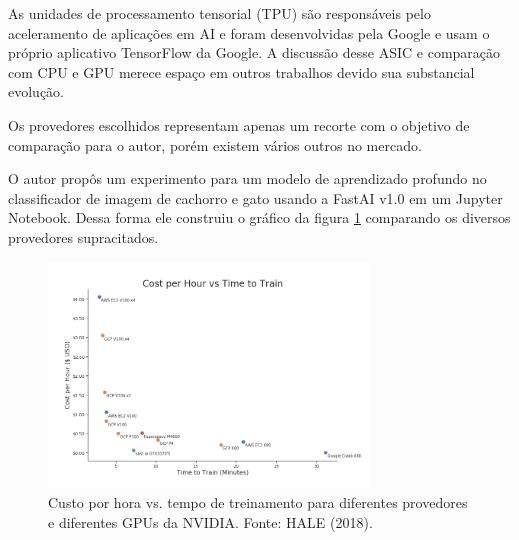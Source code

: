 \documentclass[letterpaper, 10 pt, conference]{ieeeconf}  %
\begin{document}
As unidades de processamento tensorial (TPU) são responsáveis pelo aceleramento de aplicações em AI e foram desenvolvidas pela Google e usam o próprio aplicativo TensorFlow da Google. A discussão desse ASIC e comparação com CPU e GPU merece espaço em outros trabalhos devido sua substancial evolução.

Os provedores escolhidos representam apenas um recorte com o objetivo de comparação para o autor, porém existem vários outros no mercado.

O autor propôs um experimento para um modelo de aprendizado profundo no classificador de imagem de cachorro e gato usando a FastAI v1.0 em um Jupyter Notebook. Dessa forma ele construiu o gráfico da figura \ref{medium:1} comparando os diversos provedores supracitados.

\begin{figure}[H]
\begin{center}
\includegraphics[width=8.5cm]{medium1.png}
\caption{Custo por hora vs. tempo de treinamento para diferentes provedores e diferentes GPUs da NVIDIA. Fonte: HALE (2018).}
\label{medium:1} 
\end{center}
\end{figure}
\end{document}
